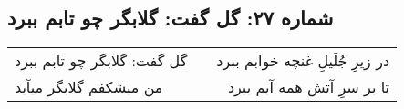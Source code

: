 \begin{center}
\section*{شماره ۲۷: گل گفت: گلابگر چو تابم ببرد}
\label{sec:027}
\begin{longtable}{l p{0.5cm} r}
گل گفت: گلابگر چو تابم ببرد
&&
در زیرِ جُلَیلِ غنچه خوابم ببرد
\\
من میشکفم گلابگر میآید
&&
تا بر سرِ آتش همه آبم ببرد
\\
\end{longtable}
\end{center}
